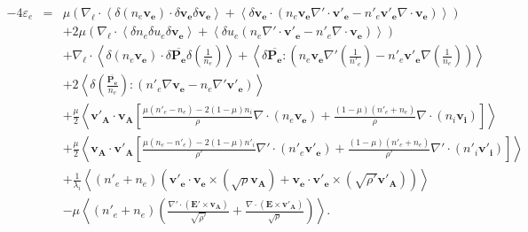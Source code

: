 \begin{eqnarray} %
  \label{eq:turb_bi_Re} -4 \varepsilon_e &=& \mu\left( \nabla_{\boldsymbol{\ell}} \cdot\left<  \delta \left(n_e \boldsymbol{v_e}\right) \cdot \delta \boldsymbol{v_e}\delta \boldsymbol{v_e} \right> +\left<\delta \boldsymbol{v_e}\cdot \left(n_e \boldsymbol{v_e}   \nabla' \cdot \boldsymbol{v'_e}- n'_e \boldsymbol{v'_e} \nabla \cdot \boldsymbol{v_e}\right)\right>\right) \nonumber \\ %
  &&+ 2  \mu \left(\nabla_{\boldsymbol{\ell}} \cdot\left<  \delta n_e  \delta u_e\delta \boldsymbol{v_e} \right> +\left<\delta u_e  \left(n_e \nabla' \cdot \boldsymbol{v'_e}- n'_e \nabla \cdot \boldsymbol{v_e}\right)\right> \right) \nonumber\\ %
  &&+ \nabla_{\boldsymbol{\ell}} \cdot\left<  \delta \left(n_e \boldsymbol{v_e}\right) \cdot \delta \overline{\boldsymbol{P_e}} \delta \left(\frac{1}{n_e}\right)\right> + \left<\delta \overline{\boldsymbol{P_e}} : \left(n_e \boldsymbol{v_e}  \nabla' \left(\frac{1}{n'_e}\right) - n'_e \boldsymbol{v'_e} \nabla \left(\frac{1}{n_e}\right)\right)\right> \nonumber \\ %
  &&+ 2 \left<\delta \left(\frac{\overline{\boldsymbol{P_e}}}{n_e}\right) : \left(n'_e \nabla\boldsymbol{v_e} - n_e \nabla' \boldsymbol{v'_e}\right) \right>  \nonumber\\ %
  &&+\frac{\mu}{2} \left<   \boldsymbol{v'_A} \cdot \boldsymbol{v_{A}}  \left[ \frac{\mu\left(n'_e - n_e\right) -2 \left(1-\mu\right) n_i}{\rho} \nabla \cdot \left(n_e \boldsymbol{v_e}\right)+ \frac{\left(1-\mu\right) \left(n'_e + n_e\right) }{\rho}\nabla \cdot \left(n_i \boldsymbol{v_i}\right)  \right] \right>\nonumber \\ %
  &&+ \frac{\mu}{2}\left<  \boldsymbol{v_A} \cdot \boldsymbol{v'_{A}} \left[\frac{\mu\left(n_e - n'_e\right) -2 \left(1-\mu\right) n'_i }{\rho'}\nabla' \cdot \left(n'_e \boldsymbol{v'_e}\right)+ \frac{ \left(1-\mu\right) \left(n'_e + n_e\right) }{\rho'}\nabla' \cdot \left(n'_i \boldsymbol{v'_i}\right)\right]  \right>\nonumber \\ %
  &&+ \frac{1}{\lambda_i} \left<\left(n'_e + n_e\right)\left(  \boldsymbol{v'_e} \cdot \boldsymbol{v_e} \times \left(\sqrt{\rho}\boldsymbol{v_A}\right) +  \boldsymbol{v_e} \cdot \boldsymbol{v'_e} \times \left( \sqrt{\rho'}\boldsymbol{v'_A}\right)\right) \right>\nonumber\\ %
  &&- \mu\left< \left(n'_e + n_e\right)  \left( \frac{ \nabla' \cdot \left(\boldsymbol{E'}\times \boldsymbol{v_A}\right) }{\sqrt{\rho'}} + \frac{\nabla \cdot \left(  \boldsymbol{E}\times \boldsymbol{v'_A} \right) }{\sqrt{\rho}}\right)\right> .%
  \end{eqnarray}  %
  
